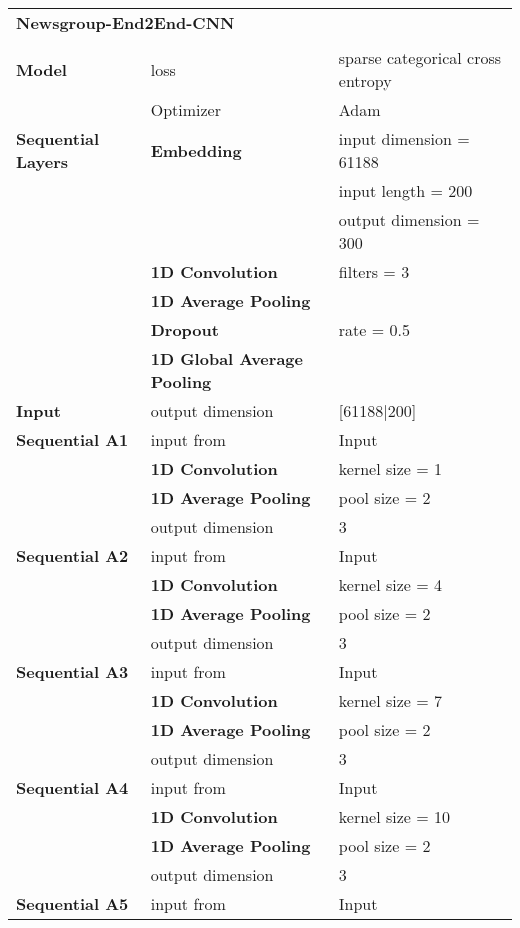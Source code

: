 \begin{tabularx}{\textwidth}[!h]{X X X}
	\multicolumn{3}{X}{\textbf{Newsgroup-End2End-CNN}}\\
	\\
	\hline
	\endhead
	\textbf{Model} & loss & sparse categorical cross entropy\\
	& Optimizer & Adam\\
	\hline
	\textbf{Sequential Layers} & \textbf{Embedding} & input dimension = 61188\\
	& & input length = 200\\
	& & output dimension = 300\\
	& \textbf{1D Convolution} & filters = 3\\
	& \textbf{1D Average Pooling} &\\
	& \textbf{Dropout} & rate = 0.5\\
	& \textbf{1D Global Average Pooling} &\\
	\hline
	\textbf{Input} & output dimension & [61188|200]\\
	[8pt]
	\textbf{Sequential A1} & input from & Input\\
	& \textbf{1D Convolution} & kernel size = 1\\
	& \textbf{1D Average Pooling} & pool size = 2\\
	& output dimension & 3\\
	[8pt]
	\textbf{Sequential A2} & input from & Input\\
	& \textbf{1D Convolution} & kernel size = 4\\
	& \textbf{1D Average Pooling} & pool size = 2\\
	& output dimension & 3\\
	[8pt]
	\textbf{Sequential A3} & input from & Input\\
	& \textbf{1D Convolution} & kernel size = 7\\
	& \textbf{1D Average Pooling} & pool size = 2\\
	& output dimension & 3\\
	[8pt]
	\textbf{Sequential A4} & input from & Input\\
	& \textbf{1D Convolution} & kernel size = 10\\
	& \textbf{1D Average Pooling} & pool size = 2\\
	& output dimension & 3\\
	[8pt]
	\textbf{Sequential A5} & input from & Input\\

\end{tabularx}
